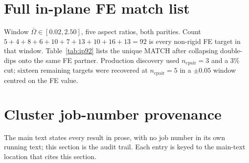 \documentclass[11pt]{article}
\begin{document}
\section{Full in-plane FE match list}\label{sec:sm-92}
Window $\bar\Omega\in[0.02,2.50]$, five aspect ratios, both parities.
Count $5+4+8+6+10+7+13+10+16+13=92$ is every non-rigid FE target in
that window. Table~\ref{tab:ip92} lists the unique MATCH after collapsing
double-dips onto the same FE partner. Production discovery used
$n_{\mathrm{cpair}}=3$ and a $3\%$ cut; sixteen remaining targets were
recovered at $n_{\mathrm{cpair}}=5$ in a $\pm 0.05$ window centred on
the FE value.



\section{Cluster job-number provenance}\label{sec:provenance}
The main text states every result in prose, with no job number in its own
running text; this section is the audit trail. Each entry is keyed to the
main-text location that cites this section.
\end{document}
